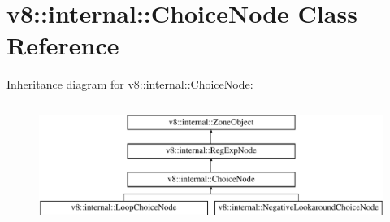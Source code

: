 \hypertarget{classv8_1_1internal_1_1ChoiceNode}{}\section{v8\+:\+:internal\+:\+:Choice\+Node Class Reference}
\label{classv8_1_1internal_1_1ChoiceNode}
Inheritance diagram for v8\+:\+:internal\+:\+:Choice\+Node\+:\begin{figure}[H]
\begin{center}
\leavevmode
\includegraphics[height=4.000000cm]{classv8_1_1internal_1_1ChoiceNode}
\end{center}
\end{figure}
